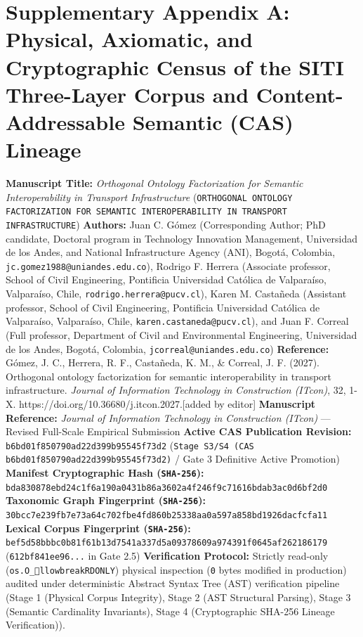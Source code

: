 \documentclass[10pt,a4paper]{article}
\begin{document}
\section*{Supplementary Appendix A: Physical, Axiomatic, and Cryptographic Census of the SITI Three-Layer Corpus and Content-Addressable Semantic (CAS) Lineage}

\textbf{Manuscript Title:} \textit{Orthogonal Ontology Factorization for Semantic Interoperability in Transport Infrastructure} (\texttt{ORTHOGONAL ONTOLOGY FACTORIZATION FOR SEMANTIC INTEROPERABILITY IN TRANSPORT INFRASTRUCTURE})
\textbf{Authors:} Juan C. Gómez (Corresponding Author; PhD candidate, Doctoral program in Technology Innovation Management, Universidad de los Andes, and National Infrastructure Agency (ANI), Bogotá, Colombia, \texttt{jc.gomez1988@uniandes.edu.co}), Rodrigo F. Herrera (Associate professor, School of Civil Engineering, Pontificia Universidad Católica de Valparaíso, Valparaíso, Chile, \texttt{rodrigo.herrera@pucv.cl}), Karen M. Castañeda (Assistant professor, School of Civil Engineering, Pontificia Universidad Católica de Valparaíso, Valparaíso, Chile, \texttt{karen.castaneda@pucv.cl}), and Juan F. Correal (Full professor, Department of Civil and Environmental Engineering, Universidad de los Andes, Bogotá, Colombia, \texttt{jcorreal@uniandes.edu.co})
\textbf{Reference:} Gómez, J. C., Herrera, R. F., Castañeda, K. M., \& Correal, J. F. (2027). Orthogonal ontology factorization for semantic interoperability in transport infrastructure. \textit{Journal of Information Technology in Construction (ITcon)}, 32, 1-X. https://doi.org/10.36680/j.itcon.2027.[added by editor]
\textbf{Manuscript Reference:} \textit{Journal of Information Technology in Construction (ITcon)} --- Revised Full-Scale Empirical Submission
\textbf{Active CAS Publication Revision:} \texttt{b6bd01f850790ad22d399b95545f73d2} (\texttt{Stage S3/S4 (CAS b6bd01f850790ad22d399b95545f73d2)} / Gate 3 Definitive Active Promotion)
\textbf{Manifest Cryptographic Hash (\texttt{SHA-256}):} \texttt{bda830878ebd24c1f6a190a0431b86a3602a4f246f9c71616bdab3ac0d6bf2d0}
\textbf{Taxonomic Graph Fingerprint (\texttt{SHA-256}):} \texttt{30bcc7e239fb7e73a64c702fbe4fd860b25338aa0a597a858bd1926dacfcfa11}
\textbf{Lexical Corpus Fingerprint (\texttt{SHA-256}):} \texttt{bef5d58bbbc0b81f61b13d7541a337d5a09378609a974391f0645af262186179} (\texttt{612bf841ee96...} in Gate 2.5)
\textbf{Verification Protocol:} Strictly read-only (\texttt{os.O\_llowbreak{}RDONLY}) physical inspection (\texttt{0} bytes modified in production) audited under deterministic Abstract Syntax Tree (AST) verification pipeline (Stage 1 (Physical Corpus Integrity), Stage 2 (AST Structural Parsing), Stage 3 (Semantic Cardinality Invariants), Stage 4 (Cryptographic SHA-256 Lineage Verification)).
\end{document}
